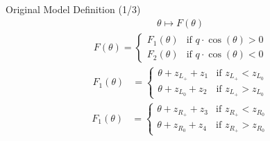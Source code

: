 \begin{frame}{Original Model Definition (1/3)}
	\vspace{-3.0em}
	\begin{align}
		\theta \mapsto F(\theta)
	\end{align}
	\begin{align}
		F(\theta) = \begin{cases}
			            F_1(\theta) & \text{if } q \cdot \cos(\theta) > 0 \\
			            F_2(\theta) & \text{if } q \cdot \cos(\theta) < 0
		            \end{cases}
	\end{align}
	\begin{align}
		F_1(\theta) & = \begin{cases}
			                \theta + z_{L_+} + z_1 & \text{if } z_{L_+} < z_{L_0} \\
			                \theta + z_{L_0} + z_2 & \text{if } z_{L_+} > z_{L_0}
		                \end{cases}
	\end{align}
	\begin{align}
		F_1(\theta) & = \begin{cases}
			                \theta + z_{R_+} + z_3 & \text{if } z_{R_+} < z_{R_0} \\
			                \theta + z_{R_0} + z_4 & \text{if } z_{R_+} > z_{R_0}
		                \end{cases}
	\end{align}
\end{frame}

